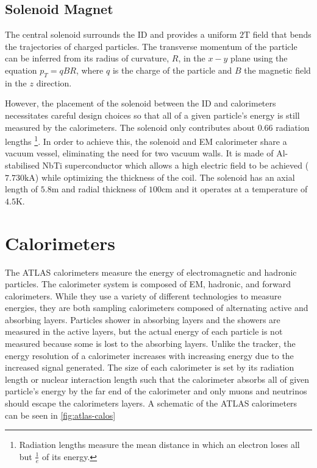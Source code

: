 \subsection{Solenoid Magnet}

The central solenoid surrounds the \ac{ID} and provides a uniform $2\textrm{T}$ field that bends the trajectories of charged particles. The transverse momentum of the particle can be inferred from its radius of curvature, $R$, in the $x-y$ plane using the equation $p_{T} = qBR$, where $q$ is the charge of the particle and $B$ the magnetic field in the $z$ direction.

However, the placement of the solenoid between the \ac{ID} and calorimeters necessitates careful design choices so that all of a given particle's energy is still measured by the calorimeters. The solenoid only contributes about $0.66$ radiation lengths \footnote{Radiation lengths measure the mean distance in which an electron loses all but $\frac{1}{e}$ of its energy.}. In order to achieve this, the solenoid and \ac{EM} calorimeter share a vacuum vessel, eliminating the need for two vacuum walls. It is made of Al-stabilised NbTi superconductor which allows a high electric field to be achieved ($7.730 \textrm{kA}$) while optimizing the thickness of the coil. The solenoid has an axial length of $5.8 \textrm{m}$ and radial thickness of $100 \textrm{cm}$ and it operates at a temperature of $4.5 \textrm{K}$. 


\section{Calorimeters}

The \ac{ATLAS} calorimeters measure the energy of electromagnetic and hadronic particles. The calorimeter system is composed of \ac{EM}, hadronic, and forward calorimeters. While they use a variety of different technologies to measure energies, they are both sampling calorimeters composed of alternating active and absorbing layers. Particles shower in absorbing layers and the showers are measured in the active layers, but the actual energy of each particle is not measured because some is lost to the absorbing layers. Unlike the tracker, the energy resolution of a calorimeter increases with increasing energy due to the increased signal generated. The size of each calorimeter is set by its radiation length or nuclear interaction length such that the calorimeter absorbs all of given particle's energy by the far end of the calorimeter and only muons and neutrinos should escape the calorimeters layers. A schematic of the \ac{ATLAS} calorimeters can be seen in \autoref{fig:atlas-calos}


